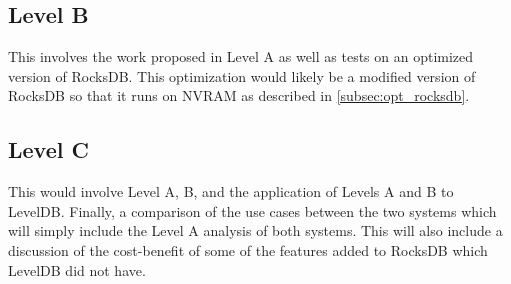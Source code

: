 \documentclass[twocolumn,11pt]{article}
\begin{document}
\subsection{Level B}

This involves the work proposed in Level A as well as tests on an optimized
version of RocksDB. This optimization would likely be a modified version of
RocksDB so that it runs on NVRAM as described in \ref{subsec:opt_rocksdb}.

\subsection{Level C}

This would involve Level A, B, and the application of Levels A and B to LevelDB.
Finally, a comparison of the use cases between the two systems which will simply
include the Level A analysis of both systems. This will also include a
discussion of the cost-benefit of some of the features added to RocksDB which
LevelDB did not have.
\end{document}
